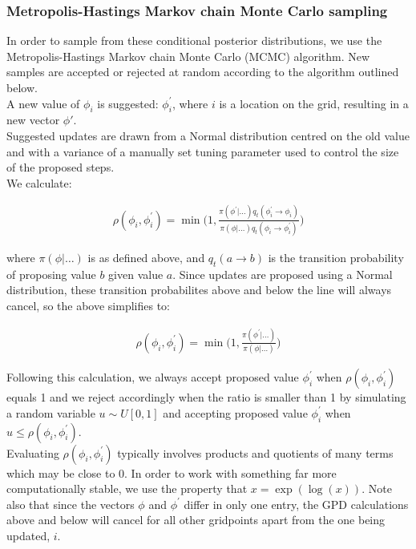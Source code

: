 \documentclass{article}
\begin{document}
\subsubsection*{Metropolis-Hastings Markov chain Monte Carlo sampling}

In order to sample from these conditional posterior distributions, we use the Metropolis-Hastings Markov chain Monte Carlo (MCMC) algorithm. New samples are accepted or rejected at random according to the algorithm outlined below. \\

A new value of $\phi_i$ is suggested: $\phi^{'}_i$, where $i$ is a location on the grid, resulting in a new vector $\phi'$. \\

Suggested updates are drawn from a Normal distribution centred on the old value and with a variance of a manually set tuning parameter used to control the size of the proposed steps. \\

We calculate:

\begin{align*}
\rho(\phi_i, \phi^{'}_i) = \min \bigg (1, \frac{\pi(\phi^{'} | \dots ) q_t(\phi^{'}_i \to \phi_i)}{ \pi(\phi | \dots ) q_t(\phi_i \to \phi^{'}_i) } \bigg)
\end{align*}

where $\pi(\phi | \dots)$ is as defined above, and $q_t(a \to b)$ is the transition probability of proposing value $b$ given value $a$. Since updates are proposed using a Normal distribution, these transition probabilites above and below the line will always cancel, so the above simplifies to:

\begin{align*}
\rho(\phi_i, \phi^{'}_i) = \min \bigg (1, \frac{\pi(\phi^{'} | \dots ) }{ \pi(\phi | \dots ) } \bigg)
\end{align*}

Following this calculation, we always accept proposed value $\phi^{'}_i$ when $\rho(\phi_i, \phi^{'}_i)$ equals 1 and we reject accordingly when the ratio is smaller than 1 by simulating a random variable $u \sim U[0, 1]$ and accepting proposed value $\phi^{'}_i$ when $u\leq \rho(\phi_i, \phi^{'}_i)$. \\

Evaluating $\rho(\phi_i, \phi^{'}_i)$ typically involves products and quotients of many terms which may be close to 0. In order to work with something far more computationally stable, we use the property that $x = \exp(\log(x))$. Note also that since the vectors $\phi$ and $\phi^{'}$ differ in only one entry, the GPD calculations above and below will cancel for all other gridpoints apart from the one being updated, $i$. \\ 
\end{document}

